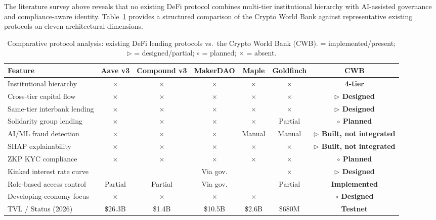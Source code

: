 \documentclass[acmsmall,screen,review]{acmart}
\newcommand{\tmarkDone}{\checkmark}
\newcommand{\tmarkNo}{$\times$}
\newcommand{\tmarkPartial}{$\triangleright$}
\newcommand{\tmarkPlanned}{$\circ$}
\newcommand{\tableheadcolor}{\rowcolor{PrimaryBlue!12}}
\begin{document}
The literature survey above reveals that no existing DeFi protocol combines multi-tier institutional hierarchy with AI-assisted governance and compliance-aware identity. Table~\ref{tab:protocol-comparison} provides a structured comparison of the Crypto World Bank against representative existing protocols on eleven architectural dimensions.

\begin{table}[H]
\centering
\setlength{\tabcolsep}{5pt}
\caption{Comparative protocol analysis: existing DeFi lending protocols vs.\ the Crypto World Bank (CWB). {\normalfont \tmarkDone{} = implemented/present; \tmarkPartial{} = designed/partial; \tmarkPlanned{} = planned; \tmarkNo{} = absent.}}
\label{tab:protocol-comparison}
\renewcommand{\arraystretch}{1.25}
\small
\begin{tabular}{@{}p{4.2cm}ccccc>{\bfseries}c@{}}
\toprule
\tableheadcolor
\tableheadfont Feature & \tableheadfont Aave v3 & \tableheadfont Compound v3 & \tableheadfont MakerDAO & \tableheadfont Maple & \tableheadfont Goldfinch & \tableheadfont CWB \\
\midrule
Institutional hierarchy & \tmarkNo{} & \tmarkNo{} & \tmarkNo{} & \tmarkNo{} & \tmarkNo{} & \tmarkDone{} 4-tier \\
\rowcolor{RowShade}
Cross-tier capital flow & \tmarkNo{} & \tmarkNo{} & \tmarkNo{} & \tmarkNo{} & \tmarkNo{} & \tmarkPartial{} Designed \\
Same-tier interbank lending & \tmarkNo{} & \tmarkNo{} & \tmarkNo{} & \tmarkNo{} & \tmarkNo{} & \tmarkPartial{} Designed \\
\rowcolor{RowShade}
Solidarity group lending & \tmarkNo{} & \tmarkNo{} & \tmarkNo{} & \tmarkNo{} & Partial & \tmarkPlanned{} Planned \\
AI/ML fraud detection & \tmarkNo{} & \tmarkNo{} & \tmarkNo{} & Manual & Manual & \tmarkPartial{} Built, not integrated \\
\rowcolor{RowShade}
SHAP explainability & \tmarkNo{} & \tmarkNo{} & \tmarkNo{} & \tmarkNo{} & \tmarkNo{} & \tmarkPartial{} Built, not integrated \\
ZKP KYC compliance & \tmarkNo{} & \tmarkNo{} & \tmarkNo{} & \tmarkNo{} & \tmarkNo{} & \tmarkPlanned{} Planned \\
\rowcolor{RowShade}
Kinked interest rate curve & \tmarkDone{} & \tmarkDone{} & Via gov. & \tmarkDone{} & \tmarkNo{} & \tmarkPartial{} Designed \\
Role-based access control & Partial & Partial & Via gov. & \tmarkDone{} & Partial & \tmarkDone{} Implemented \\
\rowcolor{RowShade}
Developing-economy focus & \tmarkNo{} & \tmarkNo{} & \tmarkNo{} & \tmarkNo{} & \tmarkDone{} & \tmarkPlanned{} Designed \\
TVL / Status (2026) & \$26.3B & \$1.4B & \$10.5B & \$2.6B & \$680M & Testnet \\
\bottomrule
\end{tabular}
\end{table}
\end{document}
